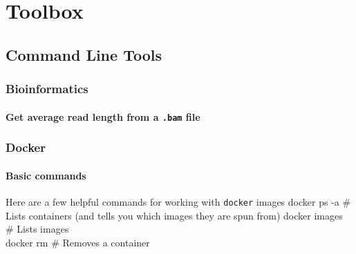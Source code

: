 \documentclass[openany]{article}
\newenvironment{Shaded}{\begin{snugshade}}{\end{snugshade}}
\newcommand{\ExtensionTok}[1]{#1}
\newcommand{\FunctionTok}[1]{\textcolor[rgb]{0.00,0.00,0.00}{#1}}
\newcommand{\KeywordTok}[1]{\textcolor[rgb]{0.13,0.29,0.53}{\textbf{#1}}}
\newcommand{\NormalTok}[1]{#1}
\newcommand{\StringTok}[1]{\textcolor[rgb]{0.31,0.60,0.02}{#1}}
\let\oldparagraph\paragraph
\renewcommand{\paragraph}[1]{\oldparagraph{#1}\mbox{}}
\begin{document}
\hypertarget{toolbox}{%
\section{Toolbox}\label{toolbox}}

\hypertarget{command-line-tools}{%
\subsection{Command Line Tools}\label{command-line-tools}}

\hypertarget{bioinformatics}{%
\subsubsection{Bioinformatics}\label{bioinformatics}}

\hypertarget{get-average-read-length-from-a-.bam-file}{%
\paragraph{\texorpdfstring{Get average read length from a \texttt{.bam} file}{Get average read length from a .bam file}}\label{get-average-read-length-from-a-.bam-file}}

\begin{Shaded}
\end{Shaded}

\hypertarget{docker}{%
\subsubsection{Docker}\label{docker}}

\hypertarget{basic-commands}{%
\paragraph{Basic commands}\label{basic-commands}}

Here are a few helpful commands for working with \texttt{docker} images
docker ps -a \# Lists containers (and tells you which images they are spun from)
docker images \# Lists images\\
docker rm \# Removes a container
\end{document}
